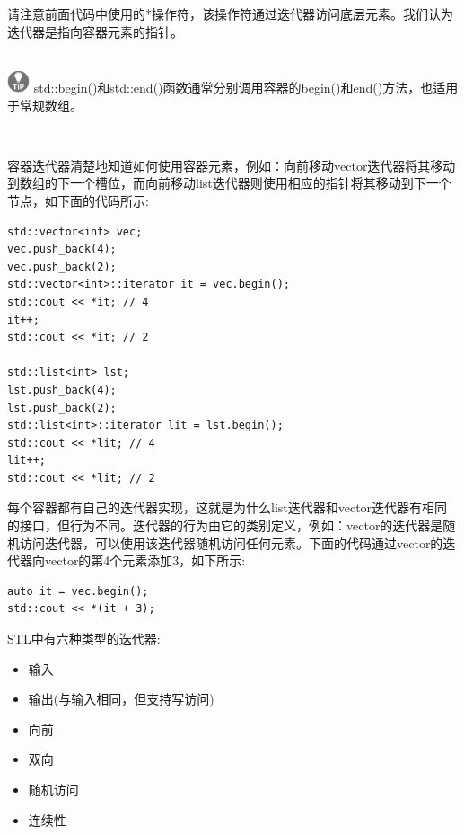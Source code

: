 请注意前面代码中使用的*操作符，该操作符通过迭代器访问底层元素。我们认为迭代器是指向容器元素的指针。 \par

\hspace*{\fill} \\ %
\includegraphics[width=0.05\textwidth]{images/tip}
std::begin()和std::end()函数通常分别调用容器的begin()和end()方法，也适用于常规数组。 \par
\noindent\textbf{}\ \par

容器迭代器清楚地知道如何使用容器元素，例如：向前移动vector迭代器将其移动到数组的下一个槽位，而向前移动list迭代器则使用相应的指针将其移动到下一个节点，如下面的代码所示: \par

\begin{lstlisting}[caption={}]
std::vector<int> vec;
vec.push_back(4);
vec.push_back(2);
std::vector<int>::iterator it = vec.begin();
std::cout << *it; // 4
it++;
std::cout << *it; // 2

std::list<int> lst;
lst.push_back(4);
lst.push_back(2);
std::list<int>::iterator lit = lst.begin();
std::cout << *lit; // 4
lit++;
std::cout << *lit; // 2
\end{lstlisting}

每个容器都有自己的迭代器实现，这就是为什么list迭代器和vector迭代器有相同的接口，但行为不同。迭代器的行为由它的类别定义，例如：vector的迭代器是随机访问迭代器，可以使用该迭代器随机访问任何元素。下面的代码通过vector的迭代器向vector的第4个元素添加3，如下所示: \par

\begin{lstlisting}[caption={}]
auto it = vec.begin();
std::cout << *(it + 3);
\end{lstlisting}

STL中有六种类型的迭代器: \par

\begin{itemize}
	\item 输入
	\item 输出(与输入相同，但支持写访问)
	\item 向前
	\item 双向
	\item 随机访问
	\item 连续性
\end{itemize}

